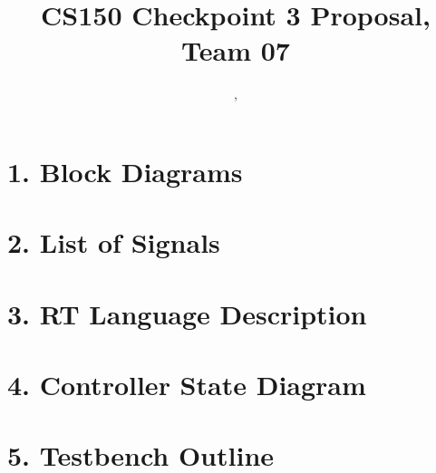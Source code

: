 \documentclass[11pt]{article}
\title{CS150 Checkpoint 3 Proposal, Team 07}
\author{\Name, \texttt{\Login}}
\begin{document}
\maketitle
\section*{1. Block Diagrams}

\section*{2. List of Signals}

\section*{3. RT Language Description}

\section*{4. Controller State Diagram}

\section*{5. Testbench Outline}
\end{document}
